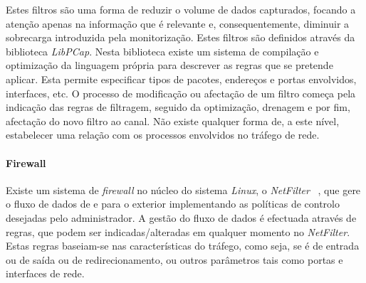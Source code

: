\documentclass[a4paper]{llncs}
\newcommand{\td}[1]{\todo[inline]{#1}}
\begin{document}



Estes filtros são uma forma de reduzir o volume de dados capturados, focando a atenção apenas na informação que é relevante e, consequentemente, diminuir a sobrecarga introduzida pela monitorização.
 Estes filtros são definidos através da biblioteca \textit{LibPCap}.
 Nesta biblioteca existe um sistema de compilação e optimização da linguagem própria para descrever as regras que se pretende aplicar.
 Esta permite especificar tipos de pacotes, endereços e portas envolvidos, interfaces, etc.
 O processo de modificação ou afectação de um filtro começa pela indicação das regras de filtragem, seguido da optimização, drenagem e por fim, afectação do novo filtro ao canal.
 Não existe qualquer forma de, a este nível, estabelecer uma relação com os processos envolvidos no tráfego de rede.


\paragraph{Firewall\\}

Existe um sistema de \textit{firewall} no núcleo do sistema \textit{Linux}, o \textit{NetFilter} ~\cite{netfiltersite}, que gere o fluxo de dados de e para o exterior implementando as políticas de controlo desejadas pelo administrador. A gestão do fluxo de dados é efectuada através de regras, que podem ser indicadas/alteradas em qualquer momento no \textit{NetFilter}. Estas regras baseiam-se nas características do tráfego, como seja, se é de entrada ou de saída ou de redirecionamento, ou outros parâmetros tais como portas e interfaces de rede.
\end{document}
